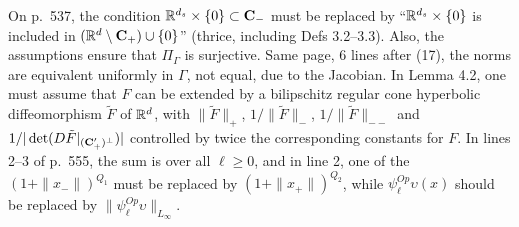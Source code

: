 \documentclass[10pt,twoside]{amsart}
\begin{document}
On p.~537, the condition $\mathbb{R}^{d_s}\times \{0\} \subset \mathbf{C}_-$ must be replaced by 
``$\mathbb{R}^{d_s}\times \{0\}$ is included in $(\mathbb{R}^{d}\setminus \mathbf{C}_+)\cup\{0\}$'' (thrice, including Defs 3.2--3.3).  Also, the
assumptions ensure that 
$\Pi_\Gamma$ is surjective. Same page, 6 lines after (17), the norms are equivalent uniformly in $\Gamma$, not equal, due to the
Jacobian. 
In Lemma 4.2, one must assume that $F$ can be extended by a bilipschitz regular cone hyperbolic diffeomorphism $\tilde F$ of $\mathbb{R}^d$,
with $\|\tilde F\|_+$, $1/\|\tilde F\|_{-}$, $1/\|\tilde F\|_{--}$ and $1/|\det (D\tilde F|_{(\mathbf{C}'_+)^\perp})|$ controlled by twice the corresponding constants
for $F$.
In  lines 2--3 of p.~555, the sum is over all $\ell \ge 0$, and in  line 2, one of
the $(1+\|x_-\|)^{Q_1}$ must  be replaced by $(1+\|x_+\|)^{Q_2}$, while $\psi^{Op}_\ell \upsilon(x)$
should be replaced by $\|\psi^{Op}_\ell \upsilon\|_{L_\infty}$.
\end{document}
